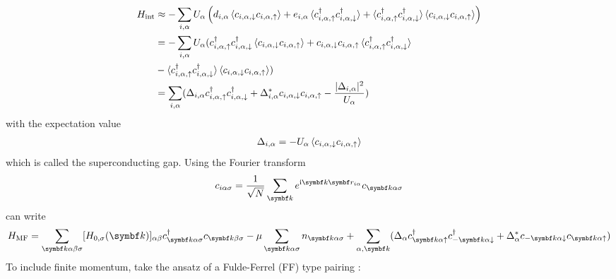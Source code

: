 \documentclass[../notes.tex]{subfiles}
\begin{document}
\begin{align}
	H_{\mathrm{int}} &\approx -\sum_{i, \alpha} U_{\alpha} \left(
	d_{i, \alpha} \braket{c_{i, \alpha, \downarrow} c_{i, \alpha, \uparrow}}
	+ e_{i, \alpha} \braket{c_{i, \alpha, \uparrow}^{\dagger} c_{i, \alpha, \downarrow}^{\dagger}}
	+ \braket{c_{i, \alpha, \uparrow}^{\dagger} c_{i, \alpha, \downarrow}^{\dagger}} \braket{c_{i, \alpha, \downarrow} c_{i, \alpha, \uparrow}}
	\right) \\
	&= -\sum_{i, \alpha} U_{\alpha} (
		c_{i, \alpha, \uparrow}^{\dagger} c_{i, \alpha, \downarrow}^{\dagger} \braket{c_{i, \alpha, \downarrow} c_{i, \alpha, \uparrow}}
		+ c_{i, \alpha, \downarrow} c_{i, \alpha, \uparrow} \braket{c_{i, \alpha, \uparrow}^{\dagger} c_{i, \alpha, \downarrow}^{\dagger}} \\	
	&- \braket{c_{i, \alpha, \uparrow}^{\dagger} c_{i, \alpha, \downarrow}^{\dagger}} \braket{c_{i, \alpha, \downarrow} c_{i, \alpha, \uparrow}} ) \\
	&= \sum_{i, \alpha} (\Delta_{i, \alpha} c_{i, \alpha, \uparrow}^{\dagger} c_{i, \alpha, \downarrow}^{\dagger} + \Delta_{i, \alpha}^{*} c_{i, \alpha, \downarrow} c_{i, \alpha, \uparrow} - \frac{\vert \Delta_{i, \alpha} \vert^2}{U_{\alpha}})
\end{align}
with the expectation value
\begin{align}
	\Delta_{i, \alpha} = -U_{\alpha} \braket{c_{i, \alpha, \downarrow} c_{i, \alpha, \uparrow}}
\end{align}
which is called the superconducting gap.
Using the Fourier transform
\begin{equation}
	c_{i \alpha \sigma} = \frac{1}{\sqrt{N}} \sum_{\vb{k}} e^{\iu \vb{k} \vb{r}_{i \alpha}} c_{\vb{k} \alpha \sigma}
\end{equation}
can write 
\begin{align}
	H_{\mathrm{MF}} = \sum_{\vb{k} \alpha \beta \sigma} [H_{0, \sigma} (\vb{k})]_{\alpha \beta} c_{\vb{k} \alpha \sigma}^{\dagger} c_{\vb{k} \beta \sigma}
	-\mu \sum_{\vb{k} \alpha \sigma} n_{\vb{k} \alpha \sigma}
	+ \sum_{\alpha, \vb{k}} (\Delta_{\alpha} c_{\vb{k} \alpha \uparrow}^{\dagger} c_{-\vb{k} \alpha \downarrow}^{\dagger} + \Delta_{\alpha}^* c_{-\vb{k} \alpha \downarrow} c_{\vb{k} \alpha \uparrow})
	\label{eq:Mean Field Hamiltonian fourier transform}
\end{align}
To include finite momentum, take the ansatz of a Fulde-Ferrel (FF) type pairing \cite{kinnunenFuldeFerrellLarkin2018}:  
\end{document}
